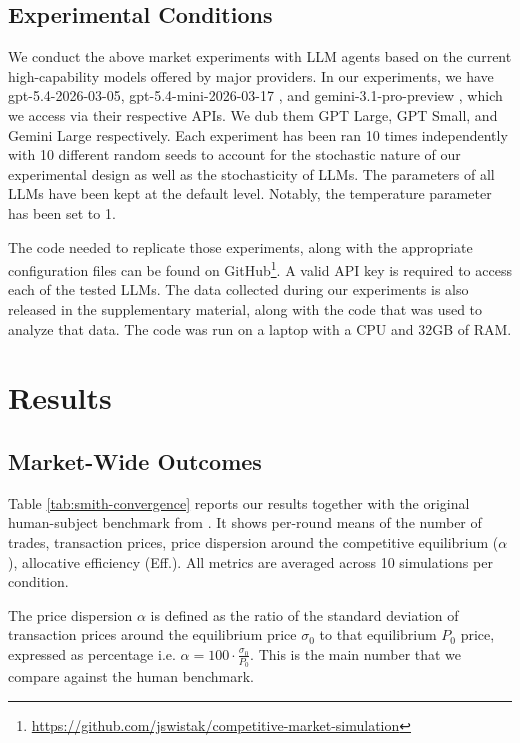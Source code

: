 \documentclass[letterpaper]{article} %
\begin{document}
\subsection{Experimental Conditions}

We conduct the above market experiments with LLM agents based on the current high-capability models offered by major providers. In our experiments, we have gpt-5.4-2026-03-05,  gpt-5.4-mini-2026-03-17 \cite{openai_api_2026}, and gemini-3.1-pro-preview \cite{gemini_api_2026}, which we access via their respective APIs. We dub them GPT Large, GPT Small, and Gemini Large respectively. Each experiment has been ran 10 times independently with 10 different random seeds to account for the
stochastic nature of our experimental design as well as the stochasticity of
LLMs. The parameters of all LLMs have been kept at the default level. Notably,
the temperature parameter has been set to 1. 

The code needed to replicate those experiments, along with the appropriate configuration files can be found on GitHub\footnote{\url{https://github.com/jswistak/competitive-market-simulation}}. A valid API key is required to access each of the tested LLMs. The data collected during our experiments is also released in the supplementary material, along with the code that was used to analyze that data. The code was run on a laptop with a CPU and 32GB of RAM.


\section{Results}
\label{sec:results}

\subsection{Market-Wide Outcomes}
\label{sec:market-wide}
Table \ref{tab:smith-convergence} reports our results together with the original human-subject benchmark from \citet{smithExperimentalStudyCompetitive1962}. It shows per-round means of the number of trades, transaction prices, price dispersion around the competitive equilibrium ($\alpha$), allocative efficiency (Eff.). All metrics are averaged across 10 simulations per condition. 

The price dispersion $\alpha$ is defined as the ratio of the standard deviation of transaction prices around the equilibrium price $\sigma_0$ to that equilibrium $P_0$ price, expressed as percentage i.e. $\alpha = 100 \cdot \frac{\sigma_0}{P_0}$. This is the main number that we compare against the human benchmark. 
 
\end{document}
